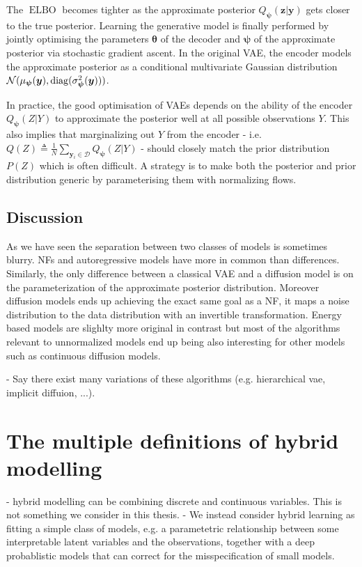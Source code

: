 The $\operatorname{ELBO}$ becomes tighter as the approximate posterior $Q_{\bm \psi}(\mathbf{z}|\mathbf{y})$ gets closer to the true posterior.
Learning the generative model is finally performed by jointly optimising the parameters $\mathbf{\theta}$ of the decoder and ${\bm \psi}$ of the approximate posterior via stochastic gradient ascent.
In the original VAE, the encoder models the approximate posterior as a conditional multivariate Gaussian distribution $\mathcal{N}(\mu_{\bm \psi}(\mathbf{y}), \diag(\sigma_{\bm\psi}^2(\mathbf{y})))$.

In practice, the good optimisation of VAEs depends on the ability of the encoder $Q_{\bm \psi}(Z|Y)$ to approximate the posterior well at all possible observations $Y$. This also implies that marginalizing out $Y$ from the encoder - i.e. $Q(Z) \triangleq \frac{1}{N}\sum_{\bm{y}_i \in \mathcal{D}} Q_{\bm \psi}(Z|Y)$ - should closely match the prior distribution $P(Z)$ which is often difficult. A strategy is to make both the posterior and prior distribution generic by parameterising them with normalizing flows.
\subsection{Discussion}
As we have seen the separation between two classes of models is sometimes blurry. NFs and autoregressive models have more in common than differences. Similarly, the only difference between a classical VAE and a diffusion model is on the parameterization of the approximate posterior distribution. Moreover diffusion models ends up achieving the exact same goal as a NF, it maps a noise distribution to the data distribution with an invertible transformation. Energy based models are slighlty more original in contrast but most of the algorithms relevant to unnormalized models end up being also interesting for other models such as continuous diffusion models.

- Say there exist many variations of these algorithms (e.g. hierarchical vae, implicit diffuion, ...).

\section{The multiple definitions of hybrid modelling}
- hybrid modelling can be combining discrete and continuous variables. This is not something we consider in  this thesis.
- We instead consider hybrid learning as fitting a simple class of models, e.g. a parametetric relationship between some interpretable latent variables and the observations, together with a deep probablistic models that can correct for the misspecification of small models.

